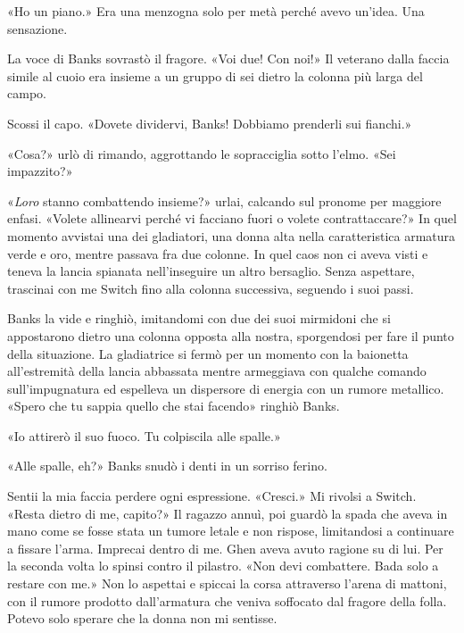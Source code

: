 «Ho un piano.» Era una menzogna solo per metà perché avevo un'idea. Una
sensazione.

La voce di Banks sovrastò il fragore. «Voi due! Con noi!» Il veterano
dalla faccia simile al cuoio era insieme a un gruppo di sei dietro la
colonna più larga del campo.

Scossi il capo. «Dovete dividervi, Banks! Dobbiamo prenderli sui
fianchi.»

«Cosa?» urlò di rimando, aggrottando le sopracciglia sotto l'elmo. «Sei
impazzito?»

«\emph{Loro} stanno combattendo insieme?» urlai, calcando sul pronome
per maggiore enfasi. «Volete allinearvi perché vi facciano fuori o
volete contrattaccare?» In quel momento avvistai una dei gladiatori, una
donna alta nella caratteristica armatura verde e oro, mentre passava fra
due colonne. In quel caos non ci aveva visti e teneva la lancia spianata
nell'inseguire un altro bersaglio. Senza aspettare, trascinai con me
Switch fino alla colonna successiva, seguendo i suoi passi.

Banks la vide e ringhiò, imitandomi con due dei suoi mirmidoni che si
appostarono dietro una colonna opposta alla nostra, sporgendosi per fare
il punto della situazione. La gladiatrice si fermò per un momento con la
baionetta all'estremità della lancia abbassata mentre armeggiava con
qualche comando sull'impugnatura ed espelleva un dispersore di energia
con un rumore metallico. «Spero che tu sappia quello che stai facendo»
ringhiò Banks.

«Io attirerò il suo fuoco. Tu colpiscila alle spalle.»

«Alle spalle, eh?» Banks snudò i denti in un sorriso ferino.

Sentii la mia faccia perdere ogni espressione. «Cresci.» Mi rivolsi a
Switch. «Resta dietro di me, capito?» Il ragazzo annuì, poi guardò la
spada che aveva in mano come se fosse stata un tumore letale e non
rispose, limitandosi a continuare a fissare l'arma. Imprecai dentro di
me. Ghen aveva avuto ragione su di lui. Per la seconda volta lo spinsi
contro il pilastro. «Non devi combattere. Bada solo a restare con me.»
Non lo aspettai e spiccai la corsa attraverso l'arena di mattoni, con il
rumore prodotto dall'armatura che veniva soffocato dal fragore della
folla. Potevo solo sperare che la donna non mi sentisse.

